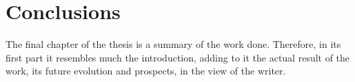 \chapter*{Conclusions}

The final chapter of the thesis
is a summary of the work done.
Therefore, in its first part it resembles much the introduction,
adding to it the actual result of the work,
its future evolution and prospects,
in the view of the writer.